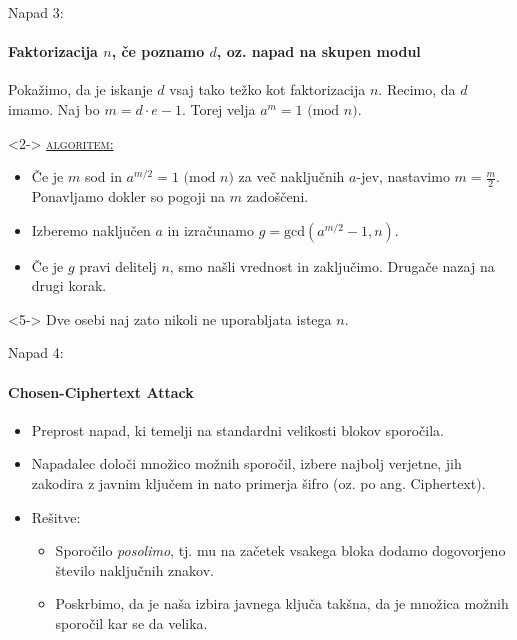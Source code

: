 \documentclass[a4paper, 12pt]{beamer} %
\newenvironment{matematika}[1]{
\textcolor{bostonuniversityred}{\underline{\textsc{#1:}}}
}{
}
\begin{document}
\begin{frame}{Napad 3:}
\framesubtitle{Faktorizacija $n$, če poznamo $d$, oz. napad na skupen modul}
Pokažimo, da je iskanje $d$ vsaj tako težko kot faktorizacija $n$. Recimo, da $d$ imamo. Naj bo $m = d \cdot e - 1$. Torej velja $a^m = 1 \text{ (mod }n)$.
\begin{block}<2->{}
\begin{matematika}{algoritem}
\begin{itemize}[label=]
\item<2->  Če je $m$ sod in $a^{m/2} = 1 \text{ (mod }n)$ za več naključnih $a$-jev, nastavimo $m = \frac{m}{2}$. Ponavljamo dokler so pogoji na $m$ zadoščeni.
\item<3-> Izberemo naključen $a$ in izračunamo $g = \text{gcd}(a^{m/2} -1, n)$.
\item<4-> Če je $g$ pravi delitelj $n$, smo našli vrednost in zaključimo. Drugače nazaj na drugi korak.
\end{itemize}
\end{matematika}
\end{block}
\begin{block}<5->{}
\alert{Dve osebi naj zato nikoli ne uporabljata istega $n$.}
\end{block}
\end{frame}

\begin{frame}{Napad 4:}
\framesubtitle{Chosen-Ciphertext Attack}
\begin{itemize}[label=]
\item<1-> Preprost napad, ki temelji na standardni velikosti blokov sporočila.
\item<2-> Napadalec določi množico možnih sporočil, izbere najbolj verjetne, jih zakodira z javnim ključem in nato primerja šifro (oz. po ang. Ciphertext).
\item <3->
Rešitve:
\begin{itemize}[label=]
\item<4-> Sporočilo \emph{posolimo}, tj. mu na začetek vsakega bloka dodamo dogovorjeno število naključnih znakov.
\item<5-> Poskrbimo, da je naša izbira javnega ključa takšna, da je množica možnih sporočil kar se da velika.
\end{itemize}
\end{itemize}
\end{frame}
\end{document}
